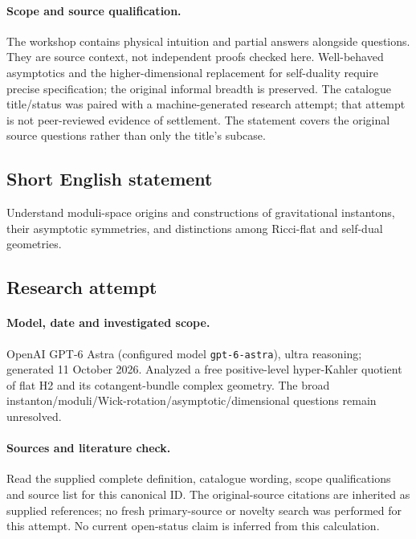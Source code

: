 \documentclass[11pt]{article}
\begin{document}
\paragraph{Scope and source qualification.}The workshop contains physical intuition and partial answers alongside questions. They are source context, not independent proofs checked here. Well-behaved asymptotics and the higher-dimensional replacement for self-duality require precise specification; the original informal breadth is preserved. The catalogue title/status was paired with a machine-generated research attempt; that attempt is not peer-reviewed evidence of settlement. The statement covers the original source questions rather than only the title’s subcase.
\subsection{Short English statement}
Understand moduli-space origins and constructions of gravitational instantons, their asymptotic symmetries, and distinctions among Ricci-flat and self-dual geometries.
\subsection{Research attempt}
\paragraph{Model, date and investigated scope.}
OpenAI GPT-6 Astra (configured model \texttt{gpt-6-astra}), ultra reasoning; generated 11 October 2026. Analyzed a free positive-level hyper-Kahler quotient of flat H2 and its cotangent-bundle complex geometry. The broad instanton/moduli/Wick-rotation/asymptotic/dimensional questions remain unresolved.

\paragraph{Sources and literature check.}
Read the supplied complete definition, catalogue wording, scope qualifications and source list for this canonical ID. The original-source citations are inherited as supplied references; no fresh primary-source or novelty search was performed for this attempt. No current open-status claim is inferred from this calculation.
\end{document}

